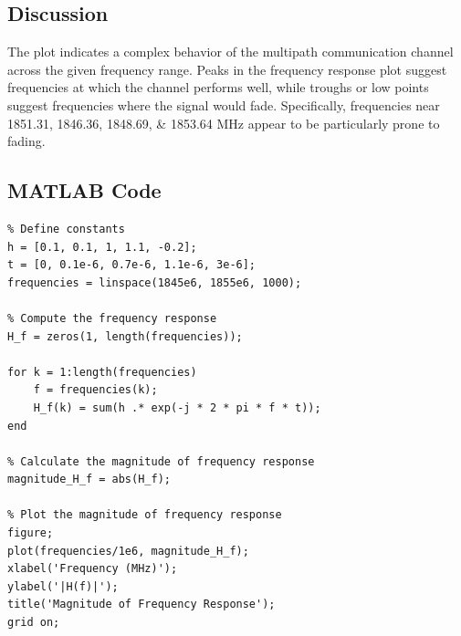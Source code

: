 \documentclass{article}
\begin{document}
\subsection*{Discussion}

The plot indicates a complex behavior of the multipath communication channel across the given frequency range. Peaks in the frequency response plot suggest frequencies at which the channel performs well, while troughs or low points suggest frequencies where the signal would fade. Specifically, frequencies near 1851.31, 1846.36, 1848.69, \& 1853.64 MHz appear to be particularly prone to fading.

\subsection*{MATLAB Code}
\begin{verbatim}
% Define constants
h = [0.1, 0.1, 1, 1.1, -0.2];
t = [0, 0.1e-6, 0.7e-6, 1.1e-6, 3e-6];
frequencies = linspace(1845e6, 1855e6, 1000);

% Compute the frequency response
H_f = zeros(1, length(frequencies));

for k = 1:length(frequencies)
    f = frequencies(k);
    H_f(k) = sum(h .* exp(-j * 2 * pi * f * t));
end

% Calculate the magnitude of frequency response
magnitude_H_f = abs(H_f);

% Plot the magnitude of frequency response
figure;
plot(frequencies/1e6, magnitude_H_f);
xlabel('Frequency (MHz)');
ylabel('|H(f)|');
title('Magnitude of Frequency Response');
grid on;
\end{verbatim}
\end{document}
